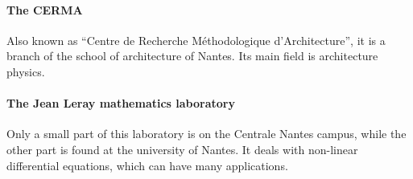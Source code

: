 \paragraph{The CERMA} Also known as “Centre de Recherche Méthodologique d'Architecture”, it is a branch of the school of architecture of Nantes. Its main field is architecture physics. %
\paragraph{The Jean Leray mathematics laboratory} Only a small part of this laboratory is on the Centrale Nantes campus, while the other part is found at the university of Nantes. It deals with non-linear differential equations, which can have many applications. %


